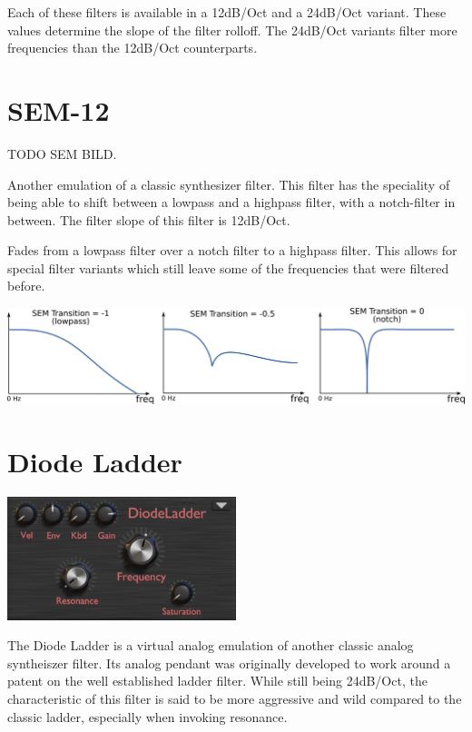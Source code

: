 Each of these filters is available in a 12dB/Oct and a 24dB/Oct variant. These values determine the slope of the filter rolloff. The 24dB/Oct variants filter more frequencies than the 12dB/Oct counterparts.

\section{SEM-12}

TODO SEM BILD.

Another emulation of a classic synthesizer filter. This filter has the speciality of being able to shift between a lowpass and a highpass filter, with a notch-filter in between. The filter slope of this filter is 12dB/Oct.

{Fades from a lowpass filter over a notch filter to a highpass filter. This allows for special filter variants which still leave some of the frequencies that were filtered before.

    \begin{center}
        \includegraphics[width=\textwidth]{graphics/SEM_transition.png}
    \end{center}
}

\section{Diode Ladder}
\begin{center}
    \includegraphics[width=0.5\textwidth]{graphics/diode_filter.png}
\end{center}

The Diode Ladder is a virtual analog emulation of another classic analog syntheiszer filter. Its analog pendant was originally developed to work around a patent on the well established ladder filter. While still being 24dB/Oct, the characteristic of this filter is said to be more aggressive and wild compared to the classic ladder, especially when invoking resonance.

